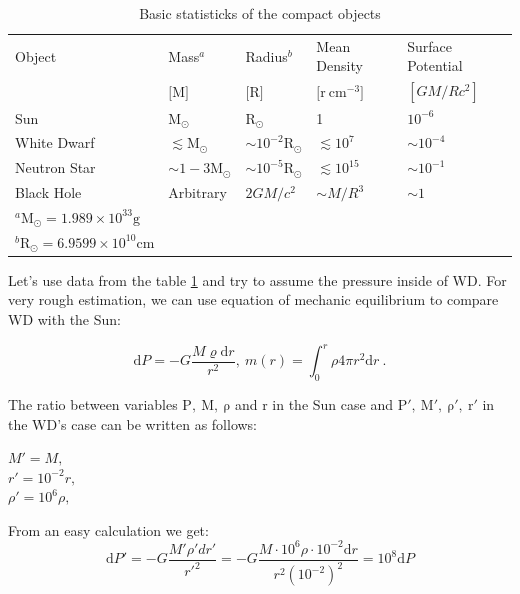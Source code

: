 \documentclass[oneside,a4paper,11pt]{report}
\begin{document}
\begin{table}[hbt!]
\caption{Basic statisticks of the compact objects \citet{2004bhwd.book.....S}}
\centering
\begin{tabular}{lllll}
\hline
\hline
Object & Mass$^a$ & Radius$^b$ & Mean Density & Surface Potential  \\
       & $[\mathrm{M]}$ & $[\mathrm{R]}$ & $[\mathrm{r\:cm^{-3}]}$& $[GM/Rc^2]$                    \\
\hline
Sun         & $\mathrm{M_{\odot}}$            & $\mathrm{R_{\odot}}$             &1                  &$10^{-6}$ \\
White Dwarf & $\lesssim \mathrm{M_{\odot}}$   & $\sim 10^{-2}\mathrm{R_{\odot}}$ & $\lesssim 10^7$   &$\sim 10^{-4}$ \\
Neutron Star& $\sim1-3\mathrm{M_{\odot}}$     & $\sim 10^{-5}\mathrm{R_{\odot}}$ & $\lesssim 10^{15}$& $\sim 10^{-1}$\\
Black Hole  & Arbitrary              & $2GM/c^2$               & $\sim M/R^3$      & $\sim1$\\
\hline
\footnotesize
$^a \mathrm{M_{\odot}}=1.989 \times 10^{33} \mathrm{g}$ &&&& \\
\footnotesize
$^b \mathrm{R_{\odot}}=6.9599 \times 10^{10} \mathrm{cm}$ &&&& \\
\end{tabular}
\label{comobj1}
\end{table}

Let's use data from the table \ref{comobj1} and try to assume the pressure inside of WD. For very 
rough estimation, we can use equation of mechanic equilibrium to compare WD with the Sun:

\begin{equation}
 \mathrm{d}P = -G\frac{M \varrho  \mathrm{d}r}{r^2},\:m(r) = \int_{0}^{r}\rho 4 \pi r^2 \mathrm{d}r \:.
\end{equation}

The ratio between variables $\mathrm{P,\: M,\: \rho}$ and $\mathrm{r}$ in the Sun case and $\mathrm{P', \:M',\: \rho',\: r'}$ in the WD's 
case can be written as follows:

\begin{center}
 $M' = M ,$  \\
 $r' = 10^{-2}r,$ \\
 $\rho' = 10^6 \rho,$ \\
\end{center}

From an easy calculation we get: 
\begin{equation}
 \mathrm{d}P' = -G\frac{M' \rho' dr'}{r'^2} = -G\frac{M \cdot 10^6 \rho \cdot 10^{-2} \mathrm{d}r}{r^2 (10^{-2})^2} = 10^{8} \mathrm{d}P
\end{equation}
\end{document}
